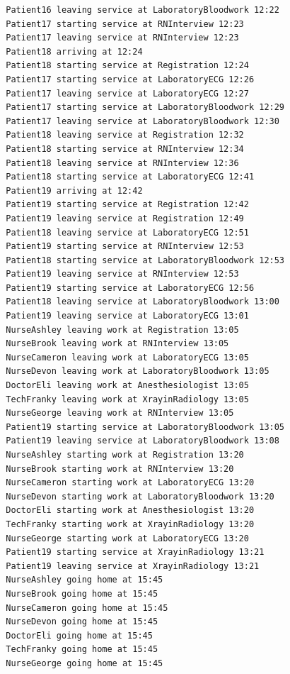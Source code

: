 \documentclass[12pt]{article}
\begin{document}
\begin{verbatim}
		Patient16 leaving service at LaboratoryBloodwork 12:22
		Patient17 starting service at RNInterview 12:23
		Patient17 leaving service at RNInterview 12:23
		Patient18 arriving at 12:24
		Patient18 starting service at Registration 12:24
		Patient17 starting service at LaboratoryECG 12:26
		Patient17 leaving service at LaboratoryECG 12:27
		Patient17 starting service at LaboratoryBloodwork 12:29
		Patient17 leaving service at LaboratoryBloodwork 12:30
		Patient18 leaving service at Registration 12:32
		Patient18 starting service at RNInterview 12:34
		Patient18 leaving service at RNInterview 12:36
		Patient18 starting service at LaboratoryECG 12:41
		Patient19 arriving at 12:42
		Patient19 starting service at Registration 12:42
		Patient19 leaving service at Registration 12:49
		Patient18 leaving service at LaboratoryECG 12:51
		Patient19 starting service at RNInterview 12:53
		Patient18 starting service at LaboratoryBloodwork 12:53
		Patient19 leaving service at RNInterview 12:53
		Patient19 starting service at LaboratoryECG 12:56
		Patient18 leaving service at LaboratoryBloodwork 13:00
		Patient19 leaving service at LaboratoryECG 13:01
		NurseAshley leaving work at Registration 13:05
		NurseBrook leaving work at RNInterview 13:05
		NurseCameron leaving work at LaboratoryECG 13:05
		NurseDevon leaving work at LaboratoryBloodwork 13:05
		DoctorEli leaving work at Anesthesiologist 13:05
		TechFranky leaving work at XrayinRadiology 13:05
		NurseGeorge leaving work at RNInterview 13:05
		Patient19 starting service at LaboratoryBloodwork 13:05
		Patient19 leaving service at LaboratoryBloodwork 13:08
		NurseAshley starting work at Registration 13:20
		NurseBrook starting work at RNInterview 13:20
		NurseCameron starting work at LaboratoryECG 13:20
		NurseDevon starting work at LaboratoryBloodwork 13:20
		DoctorEli starting work at Anesthesiologist 13:20
		TechFranky starting work at XrayinRadiology 13:20
		NurseGeorge starting work at LaboratoryECG 13:20
		Patient19 starting service at XrayinRadiology 13:21
		Patient19 leaving service at XrayinRadiology 13:21
		NurseAshley going home at 15:45
		NurseBrook going home at 15:45
		NurseCameron going home at 15:45
		NurseDevon going home at 15:45
		DoctorEli going home at 15:45
		TechFranky going home at 15:45
		NurseGeorge going home at 15:45
		\end{verbatim}
		
\end{document}
